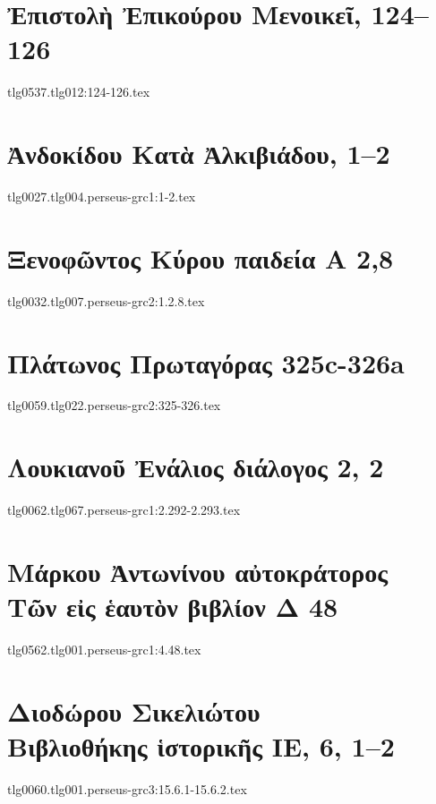 \documentclass[a4paper,12pt,twoside]{report}
\begin{document}
\newpage





\chapter[Ἐπίκουρος Μενοικεῖ]{\textgreek[variant=ancient]{Ἐπιστολὴ Ἐπικούρου Μενοικεῖ,} 124–126}
{tlg0537.tlg012:124-126.tex}

\chapter[Ἀνδοκίδου Κατὰ Ἀλκιβιάδου]{\textgreek[variant=ancient]{Ἀνδοκίδου Κατὰ Ἀλκιβιάδου,} 1–2}
{tlg0027.tlg004.perseus-grc1:1-2.tex}

\chapter[Ξενοφῶντος Κύρου παιδεία]{\textgreek[variant=ancient]{Ξενοφῶντος Κύρου παιδεία Α} 2,8}
{tlg0032.tlg007.perseus-grc2:1.2.8.tex}



\chapter[Πλάτωνος Πρωταγόρας]{\textgreek[variant=ancient]{Πλάτωνος Πρωταγόρας} 325c-326a}
{tlg0059.tlg022.perseus-grc2:325-326.tex}

\chapter[Λουκιανοῦ Ἐνάλιος διάλογος]{\textgreek[variant=ancient]{Λουκιανοῦ Ἐνάλιος διάλογος} 2, 2}
{tlg0062.tlg067.perseus-grc1:2.292-2.293.tex}

\chapter[Μάρκου Ἀντωνίνου Τῶν εἰς ἑαυτὸν Δ]{\textgreek[variant=ancient]{Μάρκου Ἀντωνίνου αὐτοκράτορος \\Τῶν εἰς ἑαυτὸν βιβλίον Δ} 48}
{tlg0562.tlg001.perseus-grc1:4.48.tex}

\chapter[Διοδώρου Βιβλιοθήκης ἱστορικής ΙΕ]{\textgreek[variant=ancient]{Διοδώρου Σικελιώτου \\Βιβλιοθήκης ἱστορικῆς ΙΕ,} 6, 1–2}
{tlg0060.tlg001.perseus-grc3:15.6.1-15.6.2.tex}
\end{document}
